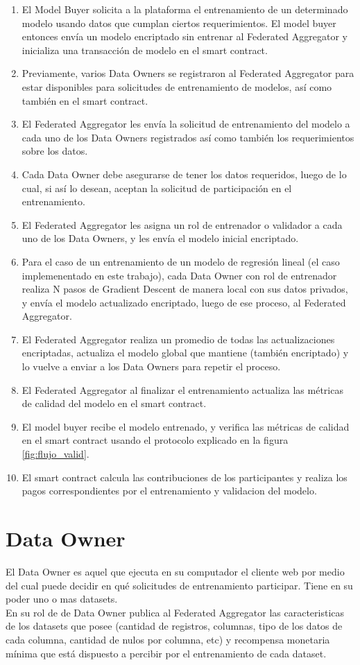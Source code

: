 \documentclass[
11pt, %
oneside, %
spanish, %
singlespacing, %
parskip, %
headsepline, %
chapterinoneline, %
]{MastersDoctoralThesis} %
\begin{document}
\begin{enumerate}
\item El Model Buyer solicita a la plataforma el entrenamiento de un determinado modelo usando datos que cumplan ciertos requerimientos. El model buyer entonces envía un modelo encriptado sin entrenar al Federated Aggregator y inicializa una transacción de modelo en el smart contract.
\item Previamente, varios Data Owners se registraron al Federated Aggregator para estar disponibles para solicitudes de entrenamiento de modelos, así como también en el smart contract.
\item El Federated Aggregator les envía la solicitud de entrenamiento del modelo a cada uno de los Data Owners registrados así como también los requerimientos sobre los datos.
\item Cada Data Owner debe asegurarse de tener los datos requeridos, luego de lo cual, si así lo desean, aceptan la solicitud de participación en el entrenamiento.
\item El Federated Aggregator les asigna un rol de entrenador o validador a cada uno de los Data Owners, y les envía el modelo inicial encriptado.
\item Para el caso de un entrenamiento de un modelo de regresión lineal (el caso implemenentado en este trabajo), cada Data Owner con rol de entrenador realiza N pasos de Gradient Descent de manera local con sus datos privados, y envía el modelo actualizado encriptado, luego de ese proceso, al Federated Aggregator.
\item El Federated Aggregator realiza un promedio de todas las actualizaciones encriptadas, actualiza el modelo global que mantiene (también encriptado) y lo vuelve a enviar a los Data Owners para repetir el proceso.
\item El Federated Aggregator al finalizar el entrenamiento actualiza las métricas de calidad del modelo en el smart contract.
\item El model buyer recibe el modelo entrenado, y verifica las métricas de calidad en el smart contract usando el protocolo explicado en la figura \ref{fig:flujo_valid}.
\item El smart contract calcula las contribuciones de los participantes y realiza los pagos correspondientes por el entrenamiento y validacion del modelo.
\end{enumerate}


\section{Data Owner}
\justify
El Data Owner es aquel que ejecuta en su computador el cliente web por medio del cual puede decidir en qué solicitudes de entrenamiento participar. Tiene en su poder uno o mas datasets. \\
En su rol de de Data Owner publica al Federated Aggregator las caracteristicas de los datasets que posee (cantidad de registros, columnas, tipo de los datos de cada columna, cantidad de nulos por columna, etc) y recompensa monetaria mínima que está dispuesto a percibir por el entrenamiento de cada dataset.
\end{document}
